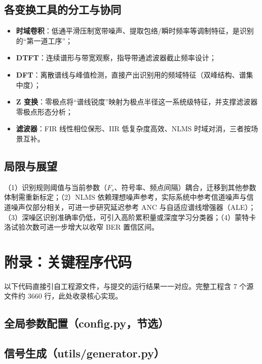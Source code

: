 \documentclass[12pt, a4paper, UTF8]{ctexart}
\begin{document}
\subsection{各变换工具的分工与协同}

\begin{itemize}
  \item \textbf{时域卷积}：低通平滑压制宽带噪声、提取包络/瞬时频率等调制特征，是识别的``第一道工序''；
  \item \textbf{DTFT}：连续谱形与带宽观察，指导带通滤波器截止频率设计；
  \item \textbf{DFT}：离散谱线与峰值检测，直接产出识别用的频域特征（双峰结构、谱集中度）；
  \item \textbf{Z 变换}：零极点将``谱线锐度''映射为极点半径这一系统级特征，并支撑滤波器零极点形态分析；
  \item \textbf{滤波器}：FIR 线性相位保形、IIR 低复杂度高效、NLMS 时域对消，三者按场景互补。
\end{itemize}

\subsection{局限与展望}

（1）识别规则阈值与当前参数（$F_s$、符号率、频点间隔）耦合，迁移到其他参数体制需重新标定；（2）NLMS 依赖理想噪声参考，实际系统中参考信道噪声与信道噪声仅部分相关，可进一步研究延迟参考 ANC 与自适应谱线增强器（ALE）；（3）深噪区识别准确率仍低，可引入高阶累积量或深度学习分类器；（4）蒙特卡洛试验次数可进一步增大以收窄 BER 置信区间。

\appendix
\section{附录：关键程序代码}

以下代码直接引自工程源文件，与提交的运行结果一一对应。完整工程含 7 个源文件约 3660 行，此处收录核心实现。

\subsection{全局参数配置（config.py，节选）}


\subsection{信号生成（utils/generator.py）}

\end{document}
